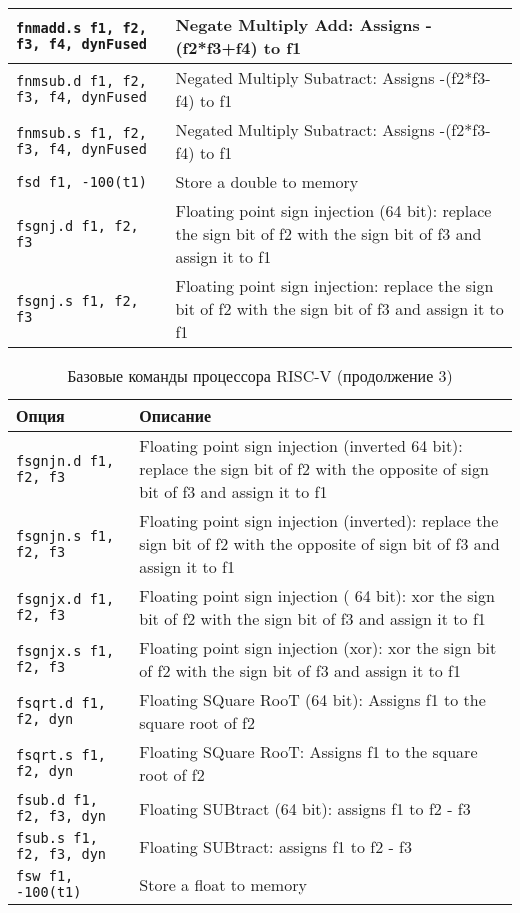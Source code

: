 \begin{table}[h]
\begin{tabularx}{\textwidth}{|l|X|}
        \hline \verb|fnmadd.s f1, f2, f3, f4, dynFused| & Negate Multiply Add: Assigns -(f2*f3+f4) to f1 \\
        \hline \verb|fnmsub.d f1, f2, f3, f4, dynFused| & Negated Multiply Subatract: Assigns -(f2*f3-f4) to f1 \\
        \hline \verb|fnmsub.s f1, f2, f3, f4, dynFused| & Negated Multiply Subatract: Assigns -(f2*f3-f4) to f1 \\
        \hline \verb|fsd f1, -100(t1)| & Store a double to memory \\
        \hline \verb|fsgnj.d f1, f2, f3| & Floating point sign injection (64 bit): replace the sign bit of f2 with the sign bit of f3 and assign it to f1 \\
        \hline \verb|fsgnj.s f1, f2, f3| & Floating point sign injection: replace the sign bit of f2 with the sign bit of f3 and assign it to f1 \\
        \hline
    \end{tabularx}
    \label{table-base-instructions3}
\end{table}

\begin{table}[h]
    \caption{Базовые команды процессора RISC-V (продолжение 3)}
    \centering
    \begin{tabularx}{\textwidth}{|l|X|}
        \hline
        \textbf{Опция} & \textbf{Описание} \\
        \hline \hline
        \hline \verb|fsgnjn.d f1, f2, f3| & Floating point sign injection (inverted 64 bit): replace the sign bit of f2 with the opposite of sign bit of f3 and assign it to f1 \\
        \hline \verb|fsgnjn.s f1, f2, f3| & Floating point sign injection (inverted): replace the sign bit of f2 with the opposite of sign bit of f3 and assign it to f1 \\
        \hline \verb|fsgnjx.d f1, f2, f3| & Floating point sign injection ( 64 bit): xor the sign bit of f2 with the sign bit of f3 and assign it to f1 \\
        \hline \verb|fsgnjx.s f1, f2, f3| & Floating point sign injection (xor): xor the sign bit of f2 with the sign bit of f3 and assign it to f1 \\
        \hline \verb|fsqrt.d f1, f2, dyn| & Floating SQuare RooT (64 bit): Assigns f1 to the square root of f2 \\
        \hline \verb|fsqrt.s f1, f2, dyn| & Floating SQuare RooT: Assigns f1 to the square root of f2 \\
        \hline \verb|fsub.d f1, f2, f3, dyn| & Floating SUBtract (64 bit): assigns f1 to f2 - f3 \\
        \hline \verb|fsub.s f1, f2, f3, dyn| & Floating SUBtract: assigns f1 to f2 - f3 \\
        \hline \verb|fsw f1, -100(t1)| & Store a float to memory \\
        \hline
    \end{tabularx}
    \label{table-base-instructions4}
\end{table}
